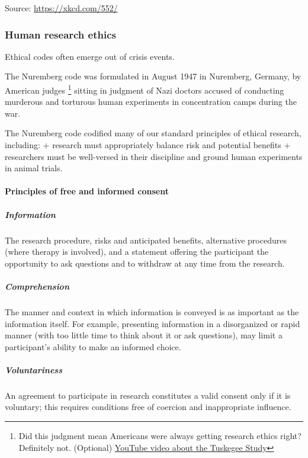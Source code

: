 \documentclass[
  openany]{book}
\begin{document}
Source: \url{https://xkcd.com/552/}

\hypertarget{human-research-ethics}{%
\subsubsection{Human research ethics}\label{human-research-ethics}}

Ethical codes often emerge out of crisis events.

The Nuremberg code was formulated in August 1947 in Nuremberg, Germany, by American judges \footnote{Did this judgment mean Americans were always getting research ethics right? Definitely not. (Optional) \href{https://www.youtube.com/watch?v=afwK2CVpc9E}{YouTube video about the Tuskegee Study}} sitting in judgment of Nazi doctors accused of conducting murderous and torturous human experiments in concentration camps during the war.

The Nuremberg code codified many of our standard principles of ethical research, including:
+ research must appropriately balance risk and potential benefits
+ researchers must be well-versed in their discipline and ground human experiments in animal trials.

\hypertarget{principles-of-free-and-informed-consent}{%
\paragraph{Principles of free and informed consent}\label{principles-of-free-and-informed-consent}}

\hypertarget{information}{%
\subparagraph{Information}\label{information}}

The research procedure, risks and anticipated benefits, alternative procedures (where therapy is involved), and a statement offering the participant the opportunity to ask questions and to withdraw at any time from the research.

\hypertarget{comprehension}{%
\subparagraph{Comprehension}\label{comprehension}}

The manner and context in which information is conveyed is as important as the information itself. For example, presenting information in a disorganized or rapid manner (with too little time to think about it or ask questions), may limit a participant's ability to make an informed choice.

\hypertarget{voluntariness}{%
\subparagraph{Voluntariness}\label{voluntariness}}

An agreement to participate in research constitutes a valid consent only if it is voluntary; this requires conditions free of coercion and inappropriate influence.
\end{document}

